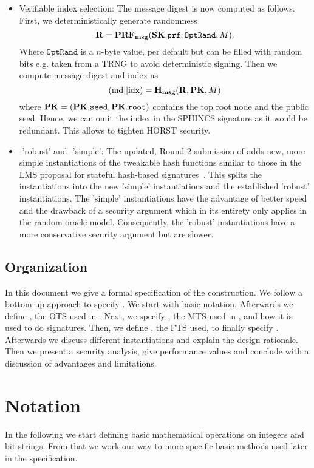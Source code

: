 \begin{itemize}
 \item Verifiable index selection: The message digest is now computed as follows.
 First, we deterministically generate randomness
        $$\mathbf{R} = \mathbf{PRF_{msg}} (\mathbf{SK}.\texttt{prf}, \texttt{OptRand}, M).$$
 Where $\texttt{OptRand}$ is a $n$-byte value, per default \pseed but can be filled
 with random bits e.g. taken from a TRNG to avoid deterministic signing. Then we compute message
 digest and index as
        $$( \textrm{md} || \textrm{idx} ) = \mathbf{H_{msg}} ( \mathbf{R}, \mathbf{PK}, M )$$
 where $\mathbf{PK} = (\mathbf{PK}.\texttt{seed}, \mathbf{PK}.\texttt{root})$ contains the top root node and the public seed.
 Hence, we can omit the index in the SPHINCS signature as it would be redundant.
 This allows to tighten HORST security.

 \item \spx-'robust' and \spx-'simple': The updated, Round 2 submission of \spx
 adds new, more simple instantiations of the tweakable hash functions
 similar to those in the LMS proposal for stateful hash-based
 signatures~\cite{LMSdraft}. This splits the instantiations into the new 'simple'
 instantiations and the established 'robust' instantiations.
 The 'simple' instantiations have the advantage
 of better speed and the drawback of a security argument which in its entirety
 only applies in the random oracle model. Consequently, the 'robust' instantiations have a more
 conservative security argument but are slower.
\end{itemize}

\subsection{Organization}
In this document we give a formal specification of the \spx construction.
We follow a bottom-up approach to specify \spx. We start with
basic notation. Afterwards we define \wotsp, the OTS used in \spx. Next, we
specify \xmss, the MTS used in \spx, and how it is used to do \hyper
signatures. Then, we define \fors, the FTS used, to finally specify
\spx. Afterwards we discuss different instantiations and explain the design
rationale. Then we present a security analysis, give performance values and
conclude with a discussion of advantages and limitations.


\section{Notation}
In the following we start defining basic mathematical operations on integers and
bit strings. From that we work our way to more specific basic methods used later
in the specification.

